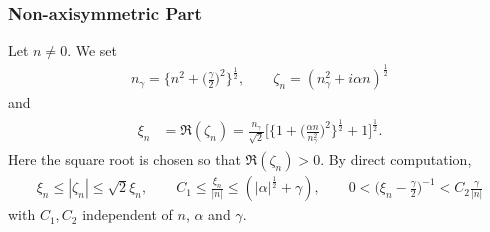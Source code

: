 \documentclass[11pt,a4paper]{article}
\numberwithin{equation}{section}
\begin{document}
\subsubsection{Non-axisymmetric Part}
\label{subsubsec.nonaxisym.horiz}


Let $n\neq0$. We set 
%
\begin{align}\label{def.zeta}
n_\gamma = \Big\{n^2 + \Big(\frac{\gamma}{2}\Big)^2\Big\}^{\frac12}, \qquad 
\zeta_n = (n_\gamma^2 + i\alpha n)^{\frac12} 
\end{align}
%
and 
%
\begin{align}\label{def.xi}
\begin{split}
\xi_n
&= 
\Re(\zeta_n) 
= 
\frac{n_\gamma}{\sqrt{2}} 
\bigg[\Big\{1 + \Big(\frac{\alpha n}{n_\gamma^2}\Big)^2\Big\}^{\frac12} + 1 \bigg]^{\frac12}. 
\end{split}
\end{align}
%
Here the square root is chosen so that $\Re(\zeta_n)>0$. By direct computation, 
%
\begin{align}\label{ineqs.xi}
\xi_n \le |\zeta_n| \le \sqrt{2} \xi_n, 
\qquad 
C_1
\le
\frac{\xi_n}{|n|}
\le 
(|\alpha|^{\frac12} + \gamma)
, 
\qquad 
0<\Big(\xi_n - \frac{\gamma}2\Big)^{-1}
< C_2\frac{\gamma}{|n|}
\end{align}
%
with $C_1, C_2$ independent of $n$, $\alpha$ and $\gamma$. 
\end{document}
